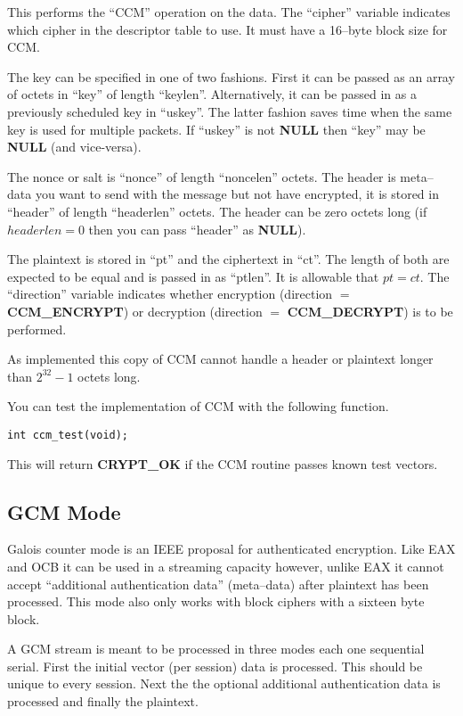 \documentclass[a4paper]{book}
\begin{document}
This performs the ``CCM'' operation on the data.  The ``cipher'' variable indicates which cipher in the descriptor table to use.  It must have a 
16--byte block size for CCM.  

The key can be specified in one of two fashions.  First it can be passed as an array of octets in ``key'' of length ``keylen''.  Alternatively,
it can be passed in as a previously scheduled key in ``uskey''.  The latter fashion saves time when the same key is used for multiple packets.  If
``uskey'' is not \textbf{NULL} then ``key'' may be \textbf{NULL} (and vice-versa). 

The nonce or salt is ``nonce'' of length ``noncelen'' octets.  The header is meta--data you want to send with the message but not have 
encrypted, it is stored in ``header'' of length ``headerlen'' octets.  The header can be zero octets long (if $headerlen = 0$ then 
you can pass ``header'' as \textbf{NULL}).  

The plaintext is stored in ``pt'' and the ciphertext in ``ct''.  The length of both are expected to be equal and is passed in as ``ptlen''.  It is
allowable that $pt = ct$.  The ``direction'' variable indicates whether encryption (direction $=$ \textbf{CCM\_ENCRYPT}) or 
decryption (direction $=$ \textbf{CCM\_DECRYPT}) is to be performed.

As implemented this copy of CCM cannot handle a header or plaintext longer than $2^{32} - 1$ octets long.  

You can test the implementation of CCM with the following function.

\begin{verbatim}
int ccm_test(void);
\end{verbatim}

This will return \textbf{CRYPT\_OK} if the CCM routine passes known test vectors.

\subsection{GCM Mode}
Galois counter mode is an IEEE proposal for authenticated encryption.  Like EAX and OCB it can be used in a streaming capacity however, unlike EAX it cannot
accept ``additional authentication data'' (meta--data) after plaintext has been processed.  This mode also only works with block ciphers with a sixteen
byte block.

A GCM stream is meant to be processed in three modes each one sequential serial.  First the initial vector (per session) data is processed.  This should be 
unique to every session.  Next the the optional additional authentication data is processed and finally the plaintext.  
\end{document}
